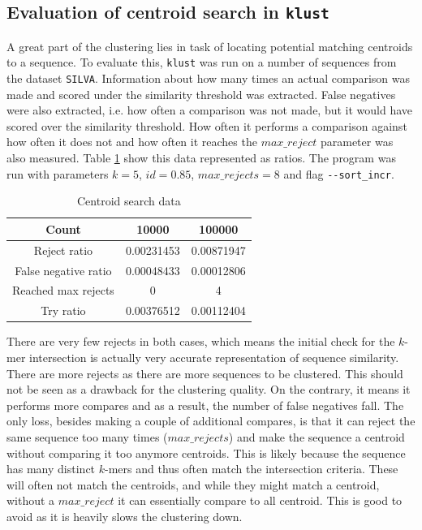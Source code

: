 
\subsection{Evaluation of centroid search in \texttt{klust}}

A great part of the clustering lies in task of locating potential matching
centroids to a sequence. To evaluate this, \texttt{klust} was run on a number
of sequences from the dataset \texttt{SILVA}. Information about how many times
an actual comparison was made and scored under the similarity threshold was
extracted. False negatives were also extracted, i.e. how often a comparison
was not made, but it would have scored over the similarity threshold. How
often it performs a comparison against how often it does not and how often it
reaches the $max\_reject$ parameter was also measured. Table
\ref{tab:centroid_search_data} show this data represented as ratios. The
program was run with parameters $k=5$, $id=0.85$, $max\_rejects=8$ and flag
\texttt{-{}-sort\_incr}.

\begin{table}[H]
  \centering
  \begin{tabular}{c|c|c}
  Count                & \num{10000} & \num{100000} \\
  \hline\hline
  Reject ratio         & 0.00231453  & 0.00871947 \\
  \hline
  False negative ratio & 0.00048433  & 0.00012806 \\
  \hline
  Reached max rejects  & 0           & 4 \\
  \hline
  Try ratio            & 0.00376512  & 0.00112404 \\
  \end{tabular}
  \caption{Centroid search data}
  \label{tab:centroid_search_data}
\end{table}

There are very few rejects in both cases, which means the initial check for
the $k$-mer intersection is actually very accurate representation of sequence
similarity. There are more rejects as there are more sequences to be
clustered. This should not be seen as a drawback for the clustering quality.
On the contrary, it means it performs more compares and as a result, the
number of false negatives fall. The only loss, besides making a couple of
additional compares, is that it can reject the same sequence too many times
($max\_rejects$) and make the sequence a centroid without comparing it too
anymore centroids. This is likely because the sequence has many distinct
$k$-mers and thus often match the intersection criteria. These will often not
match the centroids, and while they might match a centroid, without a
$max\_reject$ it can essentially compare to all centroid. This is good to
avoid as it is heavily slows the clustering down.

